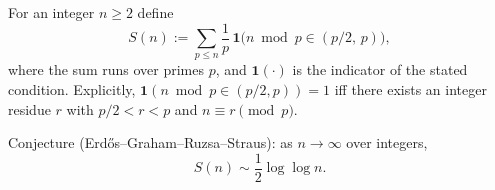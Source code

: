 For an integer $n\ge 2$ define
\[
S(n) := \sum_{p\le n} \frac{1}{p}\,\mathbf 1\big( n\bmod p \in (p/2,\,p)\big),
\]
where the sum runs over primes $p$, and $\mathbf 1(\cdot)$ is the indicator of the stated condition.
Explicitly, $\mathbf 1(n\bmod p\in(p/2,p))=1$ iff there exists an integer residue $r$ with $p/2<r<p$ and $n\equiv r\pmod p$.

Conjecture (Erd\H{o}s--Graham--Ruzsa--Straus): as $n\to\infty$ over integers,
\[
S(n) \sim \frac{1}{2}\log\log n.
\]
